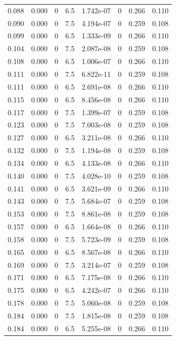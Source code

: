 \documentclass[preview]{standalone}
\begin{document}
{{\begin{tabular}{L{1.2cm}C{1.2cm} C{0.3cm}C{0.5cm} C{1.4cm}C{1.4cm} C{1.4cm}C{1.4cm}}
  0.088  &  0.000  & 0     & 6.5 &  1.742e-07  & 0  & 0.266 &  0.110   \\ 
  0.090  &  0.000  & 0     & 7.5 &  4.194e-07  & 0  & 0.259 &  0.108   \\ 
  0.099  &  0.000  & 0     & 6.5 &  1.333e-09  & 0  & 0.266 &  0.110   \\ 
  0.104  &  0.000  & 0     & 7.5 &  2.087e-08  & 0  & 0.259 &  0.108   \\ 
  0.108  &  0.000  & 0     & 6.5 &  1.006e-07  & 0  & 0.266 &  0.110   \\ 
  0.111  &  0.000  & 0     & 7.5 &  6.822e-11  & 0  & 0.259 &  0.108   \\ 
  0.111  &  0.000  & 0     & 6.5 &  2.691e-08  & 0  & 0.266 &  0.110   \\ 
  0.115  &  0.000  & 0     & 6.5 &  8.456e-08  & 0  & 0.266 &  0.110   \\ 
  0.117  &  0.000  & 0     & 7.5 &  1.399e-07  & 0  & 0.259 &  0.108   \\ 
  0.123  &  0.000  & 0     & 7.5 &  7.003e-08  & 0  & 0.259 &  0.108   \\ 
  0.127  &  0.000  & 0     & 6.5 &  3.211e-08  & 0  & 0.266 &  0.110   \\ 
  0.132  &  0.000  & 0     & 7.5 &  1.194e-08  & 0  & 0.259 &  0.108   \\ 
  0.134  &  0.000  & 0     & 6.5 &  4.133e-08  & 0  & 0.266 &  0.110   \\ 
  0.140  &  0.000  & 0     & 7.5 &  4.028e-10  & 0  & 0.259 &  0.108   \\ 
  0.141  &  0.000  & 0     & 6.5 &  3.621e-09  & 0  & 0.266 &  0.110   \\ 
  0.143  &  0.000  & 0     & 7.5 &  5.684e-07  & 0  & 0.259 &  0.108   \\ 
  0.153  &  0.000  & 0     & 7.5 &  8.861e-08  & 0  & 0.259 &  0.108   \\ 
  0.157  &  0.000  & 0     & 6.5 &  1.664e-08  & 0  & 0.266 &  0.110   \\ 
  0.158  &  0.000  & 0     & 7.5 &  5.723e-09  & 0  & 0.259 &  0.108   \\ 
  0.165  &  0.000  & 0     & 6.5 &  8.567e-08  & 0  & 0.266 &  0.110   \\ 
  0.169  &  0.000  & 0     & 7.5 &  3.214e-07  & 0  & 0.259 &  0.108   \\ 
  0.171  &  0.000  & 0     & 6.5 &  7.175e-08  & 0  & 0.266 &  0.110   \\ 
  0.175  &  0.000  & 0     & 6.5 &  4.242e-07  & 0  & 0.266 &  0.110   \\ 
  0.178  &  0.000  & 0     & 7.5 &  5.060e-08  & 0  & 0.259 &  0.108   \\ 
  0.184  &  0.000  & 0     & 7.5 &  1.815e-08  & 0  & 0.259 &  0.108   \\ 
  0.184  &  0.000  & 0     & 6.5 &  5.255e-08  & 0  & 0.266 &  0.110   \\ 
\hline 
\end{tabular} 

}}
\end{document}
